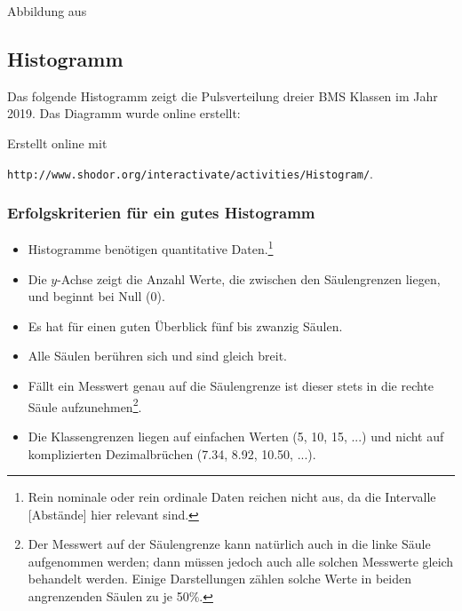 
Abbildung aus \cite{marthaler17}
\newpage




\subsection{Histogramm}

Das folgende Histogramm zeigt die Pulsverteilung dreier BMS Klassen im Jahr 2019. Das Diagramm wurde online erstellt:


Erstellt online mit

\texttt{http://www.shodor.org/interactivate/activities/Histogram/}.


\subsubsection{Erfolgskriterien für ein gutes Histogramm}
\begin{itemize}
\item Histogramme benötigen quantitative Daten.\footnote{Rein nominale
  oder rein ordinale Daten reichen nicht aus, da die Intervalle [Abstände] hier relevant sind.}
\item Die $y$-Achse zeigt die Anzahl Werte, die zwischen den Säulengrenzen liegen, und beginnt bei Null (0).
\item Es hat für einen guten Überblick fünf bis zwanzig Säulen.
\item Alle Säulen berühren sich und sind gleich breit.
\item Fällt ein Messwert genau auf die Säulengrenze ist dieser stets
  in die rechte Säule aufzunehmen\footnote{Der Messwert auf der
    Säulengrenze kann natürlich auch in die linke Säule aufgenommen
    werden; dann müssen jedoch auch alle solchen Messwerte gleich
    behandelt werden. Einige Darstellungen zählen solche Werte in beiden angrenzenden Säulen zu je 50\%.}.
\item Die Klassengrenzen liegen auf einfachen Werten (5, 10, 15, ...)
  und nicht auf komplizierten Dezimalbrüchen (7.34, 8.92, 10.50, ...).
\end{itemize}
\newpage


